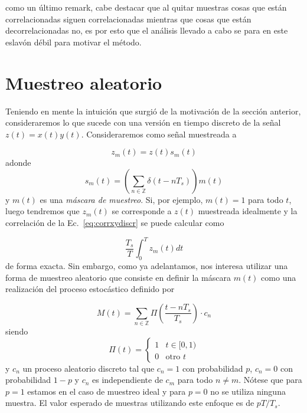 \documentclass{article}
\begin{document}
como un último remark, cabe destacar que al quitar muestras cosas que están correlacionadas siguen correlacionadas mientras que cosas que están decorrelacionadas no, es por esto que el análisis llevado a cabo se para en este eslavón débil para motivar el método.


\section{Muestreo aleatorio}

Teniendo en mente la intuición que surgió de la motivación de la sección anterior, consideraremos lo que sucede con una versión en tiempo discreto de la señal $z(t)=x(t) y(t)$. Consideraremos como señal muestreada a

\begin{equation}
    z_m(t) = z(t) s_m(t) 
\end{equation}
adonde
\begin{equation}
    s_m(t) = \left( \sum_{n \in \mathbb{Z}} \delta (t- n T_s) \right) m(t)
\end{equation}
y $m(t)$ es una \emph{máscara de muestreo}. Si, por ejemplo, $m(t)=1$ para todo $t$, luego tendremos que $z_m(t)$ se corresponde a $z(t)$ muestreada idealmente y la correlación de la Ec.~\ref{eq:corrxydiscr} se puede calcular como

\begin{equation}\label{eq:corrzm}
    \frac{T_s}{T} \int_0^T z_m(t) dt
\end{equation}
de forma exacta. Sin embargo, como ya adelantamos, nos interesa utilizar una forma de muestreo aleatorio que consiste en definir la máscara $m(t)$ como una realización del proceso estocástico definido por

\begin{equation}
    M(t) = \sum_{n \in \mathbb{Z}} \Pi\left(\frac{t-n T_s}{T_s}\right) \cdot c_n
\end{equation}
siendo
\begin{equation*}
    \Pi(t) = \left\{\begin{array}{cl}
         1 & t \in [0,1) \\
         0 & \mbox{otro } t
    \end{array} \right.
\end{equation*}
y $c_n$ un proceso aleatorio discreto tal que $c_n=1$ con probabilidad $p$, $c_n=0$ con probabilidad $1-p$ y $c_n$ es independiente de $c_m$ para todo $n \neq m$. Nótese que para $p=1$ estamos en el caso de muestreo ideal y para $p=0$ no se utiliza ninguna muestra. El valor esperado de muestras utilizando este enfoque es de $p T/T_s$.
\end{document}

